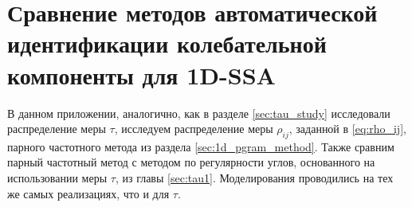 \documentclass[specialist,
               substylefile = spbu.rtx,
               subf,href,colorlinks=true, 12pt]{disser}
\begin{document}
{{%




\appendix
\chapter{Сравнение методов автоматической идентификации колебательной компоненты для 1D-SSA}
\label{sec:compare}
В данном приложении, аналогично, как в разделе \ref{sec:tau_study} исследовали распределение меры $\tau$, исследуем распределение меры $\rho_{ij}$, заданной в \eqref{eq:rho_ij}, парного частотного метода из раздела \ref{sec:1d_pgram_method}. Также сравним парный частотный метод с методом по регулярности углов, основанного на использовании меры $\tau$, из главы \ref{sec:tau1}.
Моделирования проводились на тех же самых реализациях, что и для $\tau$.
%

}}
\end{document}
